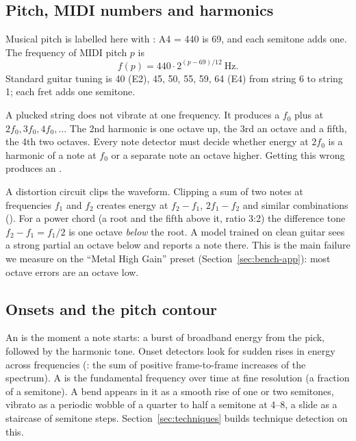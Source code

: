\subsection{Pitch, MIDI numbers and harmonics}
\label{sec:audio-harmonics}

Musical pitch is labelled here with : A4 = 440\Hz{} is 69,
and each semitone adds one. The frequency of MIDI pitch $p$ is
\[
  f(p) = 440 \cdot 2^{(p-69)/12}\ \text{Hz}.
\]
Standard guitar tuning is 40 (E2), 45, 50, 55, 59, 64 (E4) from string 6 to
string 1; each fret adds one semitone.

A plucked string does not vibrate at one frequency. It produces a
 $f_0$ plus  at $2f_0, 3f_0, 4f_0,\ldots$ The
2nd harmonic is one octave up, the 3rd an octave and a fifth, the 4th two
octaves. Every note detector must decide whether energy at $2f_0$ is a harmonic
of a note at $f_0$ or a separate note an octave higher. Getting this wrong
produces an .

\begin{keyidea}
A distortion circuit clips the waveform. Clipping a sum of two notes at
frequencies $f_1$ and $f_2$ creates energy at $f_2 - f_1$, $2f_1 - f_2$ and
similar combinations (). For a power chord (a root and the
fifth above it, ratio 3:2) the difference tone $f_2 - f_1 = f_1/2$ is one
octave \emph{below} the root. A model trained on clean guitar sees a strong
partial an octave below and reports a note there. This is the main failure we
measure on the ``Metal High Gain'' preset (Section~\ref{sec:bench-app}): most
octave errors are an octave low.
\end{keyidea}

\subsection{Onsets and the pitch contour}

An  is the moment a note starts: a burst of broadband energy from
the pick, followed by the harmonic tone. Onset detectors look for sudden rises
in energy across frequencies (: the sum of positive
frame-to-frame increases of the spectrum). A  is the
fundamental frequency over time at fine resolution (a fraction of a semitone).
A bend appears in it as a smooth rise of one or two semitones, vibrato as a
periodic wobble of a quarter to half a semitone at 4--8\Hz, a slide as a
staircase of semitone steps. Section~\ref{sec:techniques} builds technique
detection on this.

